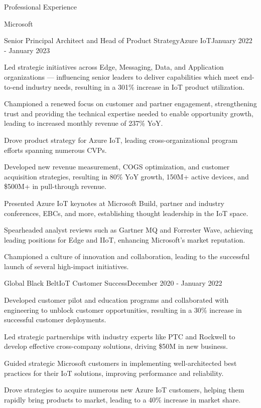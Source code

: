 \documentclass{resume} %
\begin{document}
\begin{rSection}{Professional Experience}
\begin{rCompany}{Microsoft}{}{}
\begin{rSubSubsection}{Senior Principal Architect and Head of Product Strategy}{Azure IoT}{January 2022 - January 2023}
        \item Led strategic initiatives across Edge, Messaging, Data, and Application organizations --- influencing senior leaders to deliver capabilities which meet end-to-end industry needs, resulting in a 301\% increase in IoT product utilization.
        \item Championed a renewed focus on customer and partner engagement, strengthening  trust and providing the technical expertise needed to enable opportunity growth, leading to increased monthly revenue of 237\% YoY.
        \item Drove product strategy for Azure IoT, leading cross-organizational program efforts spanning numerous CVPs.
        \item Developed new revenue measurement, COGS optimization, and customer acquisition strategies, resulting in 80\% YoY growth, 150M+ active devices, and \$500M+ in pull-through revenue.
        \item Presented Azure IoT keynotes at Microsoft Build, partner and industry conferences, EBCs, and more, establishing thought leadership in the IoT space.
        \item Spearheaded analyst reviews such as Gartner MQ and Forrester Wave, achieving leading positions for Edge and IIoT, enhancing Microsoft's market reputation.
        \item Championed a culture of innovation and collaboration, leading to the successful launch of several high-impact initiatives.
    
    \end{rSubSubsection}
    
    \begin{rSubSubsection}{Global Black Belt}{IoT Customer Success}{December 2020 - January 2022}
        \item Developed customer pilot and education programs and collaborated with engineering to unblock customer opportunities, resulting in a 30\% increase in successful customer deployments.
        \item Led strategic partnerships with industry experts like PTC and Rockwell to develop effective cross-company solutions, driving \$50M in new business.
        \item Guided strategic Microsoft customers in implementing well-architected best practices for their IoT solutions, improving performance and reliability.
        \item Drove strategies to acquire numerous new Azure IoT customers, helping them rapidly bring products to market, leading to a 40\% increase in market share.
    \end{rSubSubsection}
    

\end{rCompany}
\end{rSection}
\end{document}
